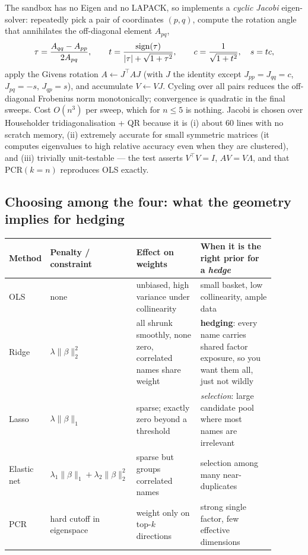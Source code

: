 The sandbox has no Eigen and no LAPACK, so  implements a
\emph{cyclic Jacobi} eigen-solver: repeatedly pick a pair of coordinates $(p,q)$, compute
the rotation angle that annihilates the off-diagonal element $A_{pq}$,
\begin{equation}
  \tau = \frac{A_{qq}-A_{pp}}{2A_{pq}},\qquad
  t = \frac{\operatorname{sign}(\tau)}{\lvert\tau\rvert+\sqrt{1+\tau^2}},\qquad
  c = \frac{1}{\sqrt{1+t^2}},\quad s = tc,
  \label{eq:jacobi}
\end{equation}
apply the Givens rotation $A\leftarrow J^{\top}AJ$ (with $J$ the identity except
$J_{pp}=J_{qq}=c$, $J_{pq}=-s$, $J_{qp}=s$), and accumulate $V\leftarrow VJ$. Cycling over
all pairs reduces the off-diagonal Frobenius norm monotonically; convergence is quadratic
in the final sweeps. Cost $O(n^3)$ per sweep, which for $n\le5$ is nothing. Jacobi is
chosen over Householder tridiagonalisation + QR because it is (i) about 60 lines with no
scratch memory, (ii) extremely accurate for small symmetric matrices (it computes
eigenvalues to high relative accuracy even when they are clustered), and (iii) trivially
unit-testable --- the test asserts $V^{\top}V=I$, $AV=V\Lambda$, and that
$\mathrm{PCR}(k{=}n)$ reproduces OLS exactly.

\subsection{Choosing among the four: what the geometry implies for hedging}
\label{sec:reg:comparison}

\begin{center}
\renewcommand{\arraystretch}{1.25}
\begin{tabular}{p{0.13\linewidth}p{0.24\linewidth}p{0.24\linewidth}p{0.28\linewidth}}
\toprule
Method & Penalty / constraint & Effect on weights & When it is the right prior for a \emph{hedge} \\
\midrule
OLS & none & unbiased, high variance under collinearity & small basket, low collinearity, ample data \\
Ridge & $\lambda\lVert\beta\rVert_2^2$ & all shrunk smoothly, none zero, correlated names share weight & \textbf{hedging}: every name carries shared factor exposure, so you want them all, just not wildly \\
Lasso & $\lambda\lVert\beta\rVert_1$ & sparse; exactly zero beyond a threshold & \emph{selection}: large candidate pool where most names are irrelevant \\
Elastic net & $\lambda_1\lVert\beta\rVert_1+\lambda_2\lVert\beta\rVert_2^2$ & sparse but groups correlated names & selection among many near-duplicates \\
PCR & hard cutoff in eigenspace & weight only on top-$k$ directions & strong single factor, few effective dimensions \\
\bottomrule
\end{tabular}
\end{center}

